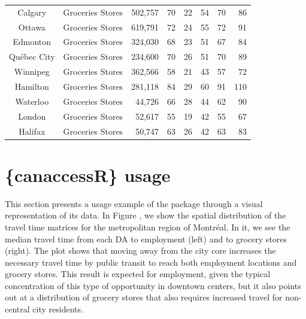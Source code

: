 \documentclass[Royal,times,sageh]{sagej}
\begin{document}
\begin{table}[t]
\begin{tabular*}{1\linewidth}{@{\extracolsep{\fill}}clrrrrrr}
Calgary & Groceries Stores & 502,757 & 70 & 22 & 54 & 70 & 86 \\ 
Ottawa & Groceries Stores & 619,791 & 72 & 24 & 55 & 72 & 91 \\ 
Edmonton & Groceries Stores & 324,030 & 68 & 23 & 51 & 67 & 84 \\ 
Québec City & Groceries Stores & 234,600 & 70 & 26 & 51 & 70 & 89 \\ 
Winnipeg & Groceries Stores & 362,566 & 58 & 21 & 43 & 57 & 72 \\ 
Hamilton & Groceries Stores & 281,118 & 84 & 29 & 60 & 91 & 110 \\ 
Waterloo & Groceries Stores & 44,726 & 66 & 28 & 44 & 62 & 90 \\ 
London & Groceries Stores & 52,617 & 55 & 19 & 42 & 55 & 67 \\ 
Halifax & Groceries Stores & 50,747 & 63 & 26 & 42 & 63 & 83 \\ 
\bottomrule
\end{tabular*}
\end{table}

\section{\{canaccessR\} usage}\label{canaccessr-usage}

This section presents a usage example of the package through a visual
representation of its data. In Figure
\citet{fig-travel_time_emp_grc_plot}, we show the spatial distribution
of the travel time matrices for the metropolitan region of Montréal. In
it, we see the median travel time from each DA to employment (left) and
to grocery stores (right). The plot shows that moving away from the city
core increases the necessary travel time by public transit to reach both
employment locations and grocery stores. This result is expected for
employment, given the typical concentration of this type of opportunity
in downtown centers, but it also points out at a distribution of grocery
stores that also requires increased travel for non-central city
residents.
\end{document}
